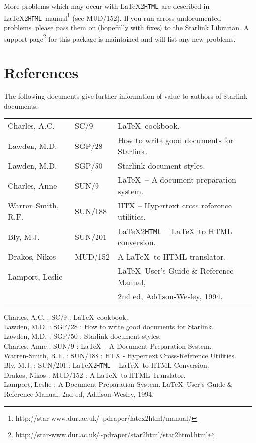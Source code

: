 \documentclass[twoside,11pt]{article}
\newcommand{\htmladdnormallinkfoot}[2]{#1\footnote{#2}}
\newcommand{\htmladdnormallink}[2]{#1}
\newenvironment{latexonly}{}{}
\newcommand{\latex}[1]{#1}
\newcommand{\xref}[3]{#1}
\newcommand{\xlabel}[1]{}
\newcommand{\latextohtml}{\LaTeX2\texttt{HTML}}
\renewcommand{\_}{\texttt{\symbol{95}}}
\newcommand{\LtoHManURL}{http://star-www.dur.ac.uk/~{}pdraper/latex2html/manual/}
\newcommand{\supportURL}{http://star-www.dur.ac.uk/\~{}pdraper/star2html/star2html.html}
\begin{document}
More problems which may occur with \latextohtml\ are described in
\htmladdnormallinkfoot{\latextohtml\ manual}{\LtoHManURL}\latex{ (see
MUD/152)}.  If you run across undocumented problems, please pass them
on (hopefully with fixes) to the
\htmladdnormallink{Starlink Librarian}{mailto:ussc@star.rl.ac.uk}.
A \htmladdnormallinkfoot{support page}{\supportURL} for this
package is maintained and will list any new problems.

\section{\xlabel{references}References}

The following documents give further information of value to authors of
Starlink documents:

\begin{latexonly}
\begin {tabular}{lll}
Charles, A.C. & \xref{SC/9}{sc9}{}
 & \LaTeX\ cookbook.\\
Lawden, M.D. & \xref{SGP/28}{sgp28}{}
 & How to write good documents for Starlink.\\
Lawden, M.D. & \xref{SGP/50}{sgp50}{}
 & Starlink document styles.\\
Charles, Anne & \xref{SUN/9}{sun9}{}
 & \LaTeX\ -- A document preparation system.\\
Warren-Smith, R.F. & \xref{SUN/188}{sun188}{}
 & HTX -- Hypertext cross-reference utilities.\\
Bly, M.J. & \xref{SUN/201}{sun201}{}
 & \latextohtml\ -- \LaTeX\ to HTML conversion.\\
Drakos, Nikos & MUD/152
 & A \LaTeX\ to HTML translator.\\
Lamport, Leslie & & \LaTeX\ User's Guide \& Reference Manual,\\
 & & 2nd ed, Addison-Wesley, 1994.\\
\end {tabular}
\end{latexonly}

\begin{htmlonly}
Charles, A.C. : \xref{SC/9}{sc9}{} :
 \LaTeX\ cookbook.\\
Lawden, M.D. : \xref{SGP/28}{sgp28}{} :
 How to write good documents for Starlink.\\
Lawden, M.D. : \xref{SGP/50}{sgp50}{} :
 Starlink document styles.\\
Charles, Anne : \xref{SUN/9}{sun9}{} :
 \LaTeX\ - A Document Preparation System.\\
Warren-Smith, R.F. : \xref{SUN/188}{sun188}{} :
 HTX - Hypertext Cross-Reference Utilities.\\
Bly, M.J. : \xref{SUN/201}{sun201}{} :
\latextohtml\ - \LaTeX\ to HTML Conversion.\\
Drakos, Nikos : MUD/152 :
 A \LaTeX\ to HTML Translator.\\
Lamport, Leslie : A Document Preparation System.
 \LaTeX\ User's Guide \& Reference Manual, 2nd ed, Addison-Wesley, 1994.
\end{htmlonly}
\end{document}
